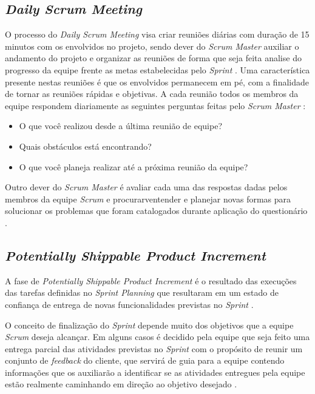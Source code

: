 \subsection*{\textit{Daily Scrum Meeting}}

\noindent O processo do \textit{Daily Scrum Meeting} visa criar reuniões diárias com duração de 15 minutos com os envolvidos no projeto, sendo dever do \textit{Scrum Master} auxiliar o andamento do projeto e organizar as reuniões de forma que seja feita analise do progresso da equipe frente as metas estabelecidas pelo \textit{Sprint} \cite{rubin2012essential}. Uma característica presente nestas reuniões é que os envolvidos permanecem em pé, com a finalidade de tornar as reuniões rápidas e objetivas. A cada reunião todos os membros da equipe respondem diariamente as seguintes perguntas feitas pelo \textit{Scrum Master} \cite{pressmanengenharia}:

\begin{itemize}
    \item O que você realizou desde a última reunião de equipe?
    \item Quais obstáculos está encontrando?
    \item O que você planeja realizar até a próxima reunião da equipe?
\end{itemize}

Outro dever do \textit{Scrum Master} é avaliar cada uma das respostas dadas pelos membros da equipe \textit{Scrum} e procurarventender e planejar novas formas para solucionar os problemas que foram catalogados durante aplicação do questionário \cite{pressmanengenharia, rubin2012essential}.

\subsection*{\textit{Potentially Shippable Product Increment}}

\noindent A fase de \textit{Potentially Shippable Product Increment} é o resultado das execuções das tarefas definidas no \textit{Sprint Planning} que resultaram em um estado de confiança de entrega de novas funcionalidades previstas no \textit{Sprint} \cite{rubin2012essential}.

O conceito de finalização do \textit{Sprint} depende muito dos objetivos que a equipe \textit{Scrum} deseja alcançar. Em alguns casos é decidido pela equipe que seja feito uma entrega parcial das atividades previstas no \textit{Sprint} com o propósito de reunir um conjunto de \textit{feedback} do cliente, que servirá de guia para a equipe contendo informações que os auxiliarão a identificar se as atividades entregues pela equipe estão realmente caminhando em direção ao objetivo desejado \cite{rubin2012essential}.